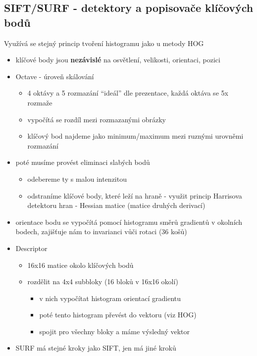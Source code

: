 \subsection{SIFT/SURF - detektory a popisovače klíčových bodů}
Využívá se stejný princip tvoření histogramu jako u metody HOG
\begin{itemize}
\item klíčové body jsou \textbf{nezávislé} na osvětlení, velikosti, orientaci, pozici
\item Octave - úroveň skálování
      \begin{itemize}
          \item 4 oktávy a 5 rozmazání “ideál” dle prezentace, každá oktáva se 5x rozmaže
          \item vypočítá se rozdíl mezi rozmazanými obrázky
          \item klíčový bod najdeme jako minimum/maximum mezi ruznými urovněmi rozmazání 
      \end{itemize}
  \item poté musíme provést eliminaci slabých bodů
      \begin{itemize}
          \item odebereme ty s malou intenzitou
          \item odstraníme klíčové body, které leží na hraně - využit princip Harrisova detektoru hran - Hessian matice (matice druhých derivací)
      \end{itemize}
  \item orientace bodu se vypočítá pomocí histogramu směrů gradientů v okolních bodech, zajišťuje nám to invarianci vůči rotaci (36 košů)
  \item Descriptor
      \begin{itemize}
          \item 16x16 matice okolo klíčových bodů 
          \item rozdělit na 4x4 subbloky (16 bloků v 16x16 okolí)
            \begin{itemize}
                \item v nich vypočítat histogram orientací gradientu
                \item poté tento histogram převést do vektoru (viz HOG)
                \item spojit pro všechny bloky a máme výsledný vektor
            \end{itemize}
      \end{itemize}
  \item SURF má stejné kroky jako SIFT, jen má jiné  kroků
\end{itemize}

